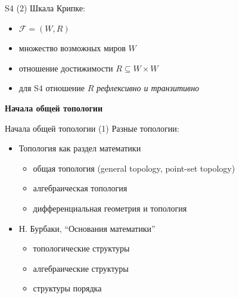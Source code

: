 \documentclass{beamer}
\begin{document}
\begin{frame}{S4 (2)}
Шкала Крипке:\\
\bigskip
\begin{itemize}
	\item $\mathcal{F} = (W, R)$
	\item множество возможных миров $W$
	\item отношение достижимости $R \subseteq W \times W$
	\item для S4 отношение $R$ \textit{рефлексивно и транзитивно}
\end{itemize}
\end{frame}

\begin{frame}{}
\begin{center}
	\textbf{Начала общей топологии}
\end{center}
\end{frame}

\begin{frame}{Начала общей топологии (1)}
Разные топологии:\\
\bigskip
\begin{itemize}
	\item Топология как раздел математики
		\begin{itemize}
			\item общая топология (general topology, point-set topology)
			\item алгебраическая топология
			\item дифференциальная геометрия и топология
		\end{itemize}
	\bigskip
	\item Н. Бурбаки, ``Основания математики''
		\begin{itemize}
			\item топологические структуры
			\item алгебраические структуры
			\item структуры порядка
		\end{itemize}
\end{itemize}
\end{frame}
\end{document}
